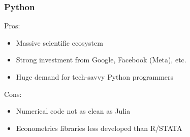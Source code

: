 \begin{frame}
    \frametitle{Python}

    Pros:
    
    \begin{itemize}
        \item Massive scientific ecosystem
            \vspace{0.5em}
        \item Strong investment from Google, Facebook (Meta), etc.
            \vspace{0.5em}
        \item Huge demand for tech-savvy Python programmers
    \end{itemize}


            \vspace{0.5em}
            \vspace{0.5em}
    Cons:
    
    \begin{itemize}
        \item Numerical code not as clean as Julia
            \vspace{0.5em}
        \item Econometrics libraries less developed than R/STATA
    \end{itemize}

\end{frame}




    



